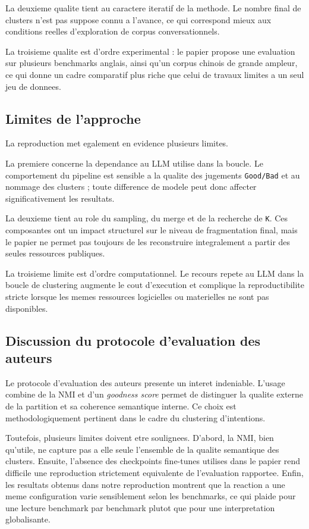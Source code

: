 La deuxieme qualite tient au caractere iteratif de la methode. Le nombre final
de clusters n'est pas suppose connu a l'avance, ce qui correspond mieux aux
conditions reelles d'exploration de corpus conversationnels.

La troisieme qualite est d'ordre experimental : le papier propose une
evaluation sur plusieurs benchmarks anglais, ainsi qu'un corpus chinois de
grande ampleur, ce qui donne un cadre comparatif plus riche que celui de
travaux limites a un seul jeu de donnees.

\subsection{Limites de l'approche}

La reproduction met egalement en evidence plusieurs limites.

La premiere concerne la dependance au LLM utilise dans la boucle. Le
comportement du pipeline est sensible a la qualite des jugements
\texttt{Good/Bad} et au nommage des clusters ; toute difference de modele peut
donc affecter significativement les resultats.

La deuxieme tient au role du sampling, du merge et de la recherche de
\texttt{K}. Ces composantes ont un impact structurel sur le niveau de
fragmentation final, mais le papier ne permet pas toujours de les reconstruire
integralement a partir des seules ressources publiques.

La troisieme limite est d'ordre computationnel. Le recours repete au LLM dans
la boucle de clustering augmente le cout d'execution et complique la
reproductibilite stricte lorsque les memes ressources logicielles ou materielles
ne sont pas disponibles.

\subsection{Discussion du protocole d'evaluation des auteurs}

Le protocole d'evaluation des auteurs presente un interet indeniable. L'usage
combine de la NMI et d'un \emph{goodness score} permet de distinguer la qualite
externe de la partition et sa coherence semantique interne. Ce choix est
methodologiquement pertinent dans le cadre du clustering d'intentions.

Toutefois, plusieurs limites doivent etre soulignees. D'abord, la NMI, bien
qu'utile, ne capture pas a elle seule l'ensemble de la qualite semantique des
clusters. Ensuite, l'absence des checkpoints fine-tunes utilises dans le papier
rend difficile une reproduction strictement equivalente de l'evaluation
rapportee. Enfin, les resultats obtenus dans notre reproduction montrent que la
reaction a une meme configuration varie sensiblement selon les benchmarks, ce
qui plaide pour une lecture benchmark par benchmark plutot que pour une
interpretation globalisante.

